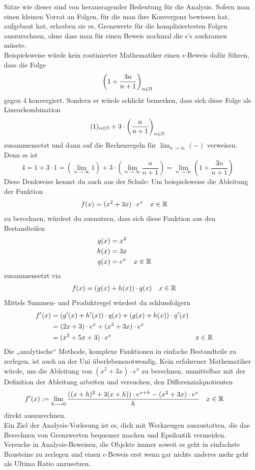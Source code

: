 \begin{bem}
 Sätze wie dieser sind von herausragender Bedeutung für die Analysis. Sofern man einen kleinen Vorrat an Folgen, für die man ihre Konvergenz bewiesen hat, aufgebaut hat, erlauben sie es, Grenzwerte für die kompliziertesten Folgen auszurechnen, ohne dass man für einen Beweis nochmal die $\epsilon$'s auskramen müsste. \\
Beispielsweise würde kein routinierter Mathematiker einen $\epsilon$-Beweis dafür führen, dass die Folge
 \[ \left( 1 + \frac{3n}{n+1} \right)_{n\in {\mathbb N}} \]
 gegen $4$ konvergiert. Sondern er würde schlicht bemerken, dass sich diese Folge als Linearkombination
 \[ (1)_{n\in {\mathbb N}} + 3\cdot \left(\frac{n}{n+1}\right)_{n\in {\mathbb N}} \]
 zusammensetzt und dann auf die Rechenregeln für $\lim_{n\to\infty}(-)$ verweisen. Denn es ist
 \[ 4 = 1+3\cdot 1 = \left( \lim_{n\to \infty} 1 \right)+3\cdot \left( \lim_{n\to \infty} \frac{n}{n+1} \right) = \lim_{n\to \infty} \left( 1+ \frac{3n}{n+1} \right) \]
 Diese Denkweise kennst du auch aus der Schule: Um beispielsweise die Ableitung der Funktion
 \begin{align*}
  f(x) &= (x^2+3x)\cdot e^x && x\in {\mathbb R}
 \end{align*}
 zu berechnen, würdest du ausnutzen, dass sich diese Funktion aus den Bestandteilen
 \begin{align*}
  g(x)& = x^2 \\
  h(x) & = 3x \\
  q(x) &= e^x && x\in {\mathbb R}
 \end{align*}
 zusammensetzt via
 \begin{align*}
  f(x) & = (g(x)+h(x))\cdot q(x) && x\in {\mathbb R}
 \end{align*}
Mittels Summen- und Produktregel würdest du schlussfolgern
\begin{align*}
 f'(x) & = (g'(x)+h'(x))\cdot q(x)  + (g(x)+h(x))\cdot q'(x) \\
 & = (2x+3)\cdot e^x + (x^2+3x)\cdot e^x \\
 & = (x^2+5x+3)\cdot e^x && x\in {\mathbb R}
\end{align*}
Die „analytische“ Methode, komplexe Funktionen in einfache Bestandteile zu zerlegen, ist auch an der Uni überlebensnotwendig. Kein erfahrener Mathematiker würde, um die Ableitung von $(x^2+3x)\cdot e^x$ zu berechnen, unmittelbar mit der Definition der Ableitung arbeiten und versuchen, den Differenzialquotienten
\begin{align*}
 f'(x)&:=\lim\limits_{h\longrightarrow 0} \frac{((x+h)^2+3(x+h))\cdot e^{x+h} - (x^2+3x)\cdot e^{x}}{h} && x\in {\mathbb R}
\end{align*}
direkt auszurechnen. \\[0.5em]
Ein Ziel der Analysis-Vorlesung ist es, dich mit Werkzeugen auszustatten, die das Berechnen von Grenzwerten bequemer machen und Epsilontik vermeiden. Versuche in Analysis-Beweisen, die Objekte immer soweit es geht in einfachste Bausteine zu zerlegen und einen $\epsilon$-Beweis erst wenn gar nichts anderes mehr geht als Ultima Ratio anzusetzen.
\end{bem}






